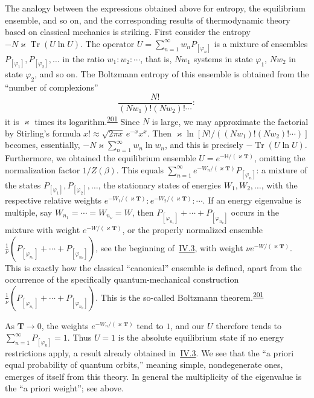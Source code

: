 \documentclass[fontsize=13pt,twoside,openany,headings=normal,parskip=false,bookmarkpackage=false,DIV=calc]{scrbook}
\begin{document}
The analogy between the expressions obtained above for entropy, the equilibrium ensemble, and so on, and the corresponding results of thermodynamic theory based on classical mechanics is striking. First consider the entropy $-N\varkappa\operatorname{Tr}(U\ln U)$. The operator $U=\sum_{n=1}^{\infty}w_nP_{[\varphi_n]}$ is a mixture of ensembles $P_{[\varphi_1]},P_{[\varphi_2]},\ldots$ in the ratio $w_1:w_2:\cdots$, that is, $Nw_1$ systems in state $\varphi_1$, $Nw_2$ in state $\varphi_2$, and so on. The Boltzmann entropy of this ensemble is obtained from the ``number of complexions''
\[
\frac{N!}{(Nw_1)!(Nw_2)!\cdots}:
\]
it is $\varkappa$ times its logarithm.\textsuperscript{\hyperlink{note-201}{201}} Since $N$ is large, we may approximate the factorial by Stirling's formula $x!\approx\sqrt{2\pi x}\,e^{-x}x^x$. Then $\varkappa\ln[N!/((Nw_1)!(Nw_2)!\cdots)]$ becomes, essentially, $-N\varkappa\sum_{n=1}^{\infty}w_n\ln w_n$, and this is precisely $-\operatorname{Tr}(U\ln U)$.
\hypertarget{origpage-211}{}%
Furthermore, we obtained the equilibrium ensemble $U=e^{-\mathsf{H}/(\varkappa\mathbf T)}$, omitting the normalization factor $1/Z(\beta)$. This equals $\sum_{n=1}^{\infty}e^{-W_n/(\varkappa\mathbf T)}P_{[\varphi_n]}$: a mixture of the states $P_{[\varphi_1]},P_{[\varphi_2]},\ldots$, the stationary states of energies $W_1,W_2,\ldots$, with the respective relative weights $e^{-W_1/(\varkappa\mathbf T)}:e^{-W_2/(\varkappa\mathbf T)}:\cdots$. If an energy eigenvalue is multiple, say $W_{n_1}=\cdots=W_{n_\nu}=W$, then $P_{[\varphi_{n_1}]}+\cdots+P_{[\varphi_{n_\nu}]}$ occurs in the mixture with weight $e^{-W/(\varkappa\mathbf T)}$, or the properly normalized ensemble $\frac1\nu(P_{[\varphi_{n_1}]}+\cdots+P_{[\varphi_{n_\nu}]})$, see the beginning of~\hyperref[sec:IV.3]{IV.3}, with weight $\nu e^{-W/(\varkappa\mathbf T)}$. This is exactly how the classical ``canonical'' ensemble is defined, apart from the occurrence of the specifically quantum-mechanical construction $\frac1\nu(P_{[\varphi_{n_1}]}+\cdots+P_{[\varphi_{n_\nu}]})$. This is the so-called Boltzmann theorem.\textsuperscript{\hyperlink{note-201}{201}}

As $\mathbf T\to0$, the weights $e^{-W_n/(\varkappa\mathbf T)}$ tend to $1$, and our $U$ therefore tends to $\sum_{n=1}^{\infty}P_{[\varphi_n]}=1$. Thus $U=1$ is the absolute equilibrium state if no energy restrictions apply, a result already obtained in~\hyperref[sec:IV.3]{IV.3}. We see that the ``a priori equal probability of quantum orbits,'' meaning simple, nondegenerate ones, emerges of itself from this theory. In general the multiplicity of the eigenvalue is the ``a priori weight''; see above.
\end{document}
